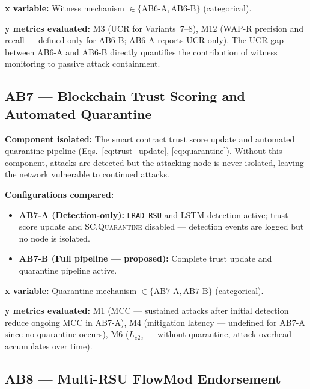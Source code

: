 \documentclass[12pt, a4paper]{report}
\begin{document}
{{\textbf{x variable:} Witness mechanism
$\in \{\text{AB6-A}, \text{AB6-B}\}$ (categorical).

\textbf{y metrics evaluated:} M3 (UCR for Variants~7--8),
M12 (WAP-R precision and recall — defined only for
AB6-B; AB6-A reports UCR only). The UCR gap between
AB6-A and AB6-B directly quantifies the contribution
of witness monitoring to passive attack containment.


\subsection{AB7 — Blockchain Trust Scoring and
Automated Quarantine}
\label{sec:ab7}

\textbf{Component isolated:}
The smart contract trust score update and automated
quarantine pipeline (Eqs.~\ref{eq:trust_update},
\ref{eq:quarantine}). Without this component,
attacks are detected but the attacking node is never
isolated, leaving the network vulnerable to continued
attacks.

\textbf{Configurations compared:}
\begin{itemize}
    \item \textbf{AB7-A (Detection-only):}
    \texttt{LRAD-RSU} and \ac{LSTM} detection active;
    trust score update and \textsc{SC.Quarantine}
    disabled — detection events are logged but no
    node is isolated.
    \item \textbf{AB7-B (Full pipeline — proposed):}
    Complete trust update and quarantine pipeline active.
\end{itemize}

\textbf{x variable:} Quarantine mechanism
$\in \{\text{AB7-A}, \text{AB7-B}\}$ (categorical).

\textbf{y metrics evaluated:} M1 (MCC — sustained
attacks after initial detection reduce ongoing MCC in
AB7-A), M4 (mitigation latency — undefined for AB7-A
since no quarantine occurs), M6 ($L_{e2e}$ — without
quarantine, attack overhead accumulates over time).


\subsection{AB8 — Multi-RSU FlowMod Endorsement}
\label{sec:ab8}

}}
\end{document}
